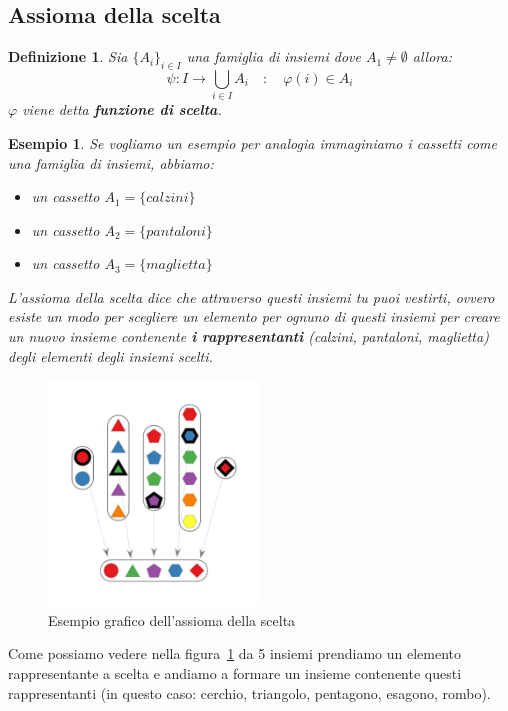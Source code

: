 \documentclass{article}
\newtheorem{exmp}{Esempio}[section]
\newtheorem{definition}{Definizione}[section]
\begin{document}
\subsection{Assioma della scelta}\label{sec:assioma_della_scelta}
\begin{definition}
        Sia $ {\{A_i\}}_{i \in I} $ una famiglia di insiemi dove $ A_1 \not = \emptyset $ allora:
        \begin{equation*}
                \psi : I \to \bigcup_{i \in I}A_i \quad : \quad  \varphi(i) \in A_i 
        \end{equation*}
        $ \varphi $ viene detta \textbf{funzione di scelta}.
\end{definition}

\begin{exmp}
Se vogliamo un esempio per analogia immaginiamo i cassetti come una famiglia di insiemi, abbiamo:
\begin{itemize}
        \item un cassetto $ A_1 = \{calzini\} $ 
        \item un cassetto $ A_2 = \{pantaloni\} $ 
        \item un cassetto $ A_3 = \{maglietta\} $ 
\end{itemize}
L'assioma della scelta dice che attraverso questi insiemi tu puoi vestirti, ovvero esiste un modo per scegliere un elemento per ognuno di questi insiemi  per creare un nuovo insieme contenente \textbf{i rappresentanti} (calzini, pantaloni, maglietta) degli elementi degli insiemi scelti.
\end{exmp}

\newpage
\begin{figure}[!h]
        \centering
                \includegraphics[width=0.5\textwidth]{esempio_assioma_della_scelta.jpg}
                \caption{Esempio grafico dell'assioma della scelta}\label{fig:esempio_assioma_della_scelta}
\end{figure}
Come possiamo vedere nella figura~\ref{fig:esempio_assioma_della_scelta} da 5 insiemi prendiamo un elemento rappresentante a scelta e andiamo a formare un insieme contenente questi rappresentanti (in questo caso: cerchio, triangolo, pentagono, esagono, rombo).
\end{document}
